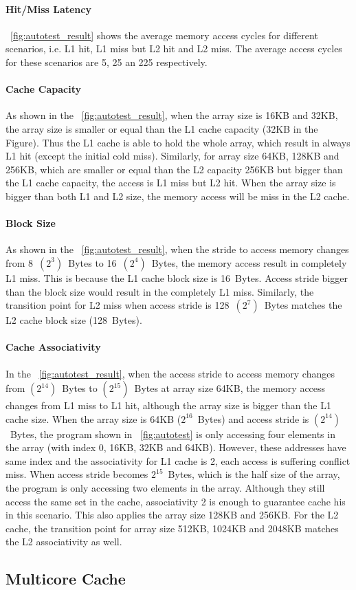\documentclass[12pt]{report}
\newcommand{\Fig}[1]{\figurename~\ref{#1}}
\begin{document}
\paragraph{Hit/Miss Latency}
\Fig{fig:autotest_result} shows the average memory access cycles for different scenarios, i.e. L1 hit, L1 miss but L2 hit and L2 miss. The average access cycles for these scenarios are 5, 25 an 225 respectively. 

\paragraph{Cache Capacity}
As shown in the \Fig{fig:autotest_result}, when the array size is 16KB and 32KB, the array size is smaller or equal than the L1 cache capacity (32KB in the Figure). Thus the L1 cache is able to hold the whole array, which result in always L1 hit (except the initial cold miss). Similarly, for array size 64KB, 128KB and 256KB, which are smaller or equal than the L2 capacity 256KB but bigger than the L1 cache capacity, the access is L1 miss but L2 hit. When the array size is bigger than both L1 and L2 size, the memory access will be miss in the L2 cache.

\paragraph{Block Size}
As shown in the \Fig{fig:autotest_result}, when the stride to access memory changes from 8~$(2^3)$~Bytes to 16~$(2^4)$~Bytes, the memory access result in completely L1 miss. This is because the L1 cache block size is 16~Bytes. Access stride bigger than the block size would result in the completely L1 miss. Similarly, the transition point for L2 miss when access stride is 128~$(2^7)$~Bytes matches the L2 cache block size (128~Bytes).

\paragraph{Cache Associativity}
In the \Fig{fig:autotest_result}, when the access stride to access memory changes from $(2^{14})$~Bytes to $(2^{15})$~Bytes at array size 64KB, the memory access changes from L1 miss to L1 hit, although the array size is bigger than the L1 cache size. When the array size is 64KB ($2^{16}$~Bytes) and access stride is $(2^{14})$~Bytes, the program shown in \Fig{fig:autotest} is only accessing four elements in the array (with index 0, 16KB, 32KB and 64KB). However, these addresses have same index and the associativity for L1 cache is 2, each access is suffering conflict miss. When access stride becomes $2^{15}$~Bytes, which is the half size of the array, the program is only accessing two elements in the array. Although they still access the same set in the cache, associativity 2 is enough to guarantee cache his in this scenario. This also applies the array size 128KB and 256KB. For the L2 cache, the transition point for array size 512KB, 1024KB and 2048KB matches the L2 associativity as well.

\subsection{Multicore Cache}
\end{document}

